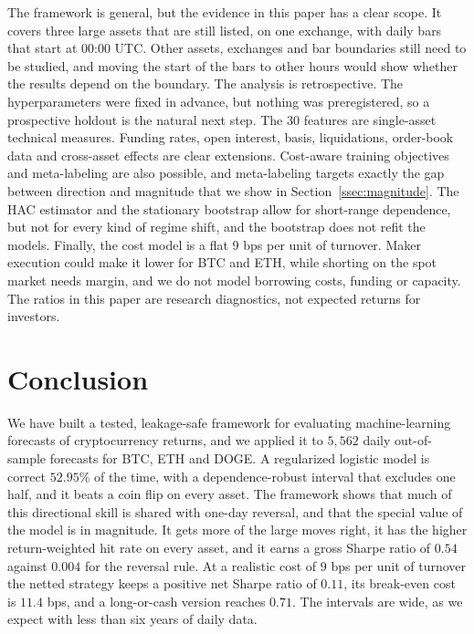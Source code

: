 \documentclass[preprint,12pt,authoryear,a4paper]{elsarticle}
\begin{document}
The framework is general, but the evidence in this paper has a clear scope. It
covers three large assets that are still listed, on one exchange, with daily bars
that start at 00:00 UTC. Other assets, exchanges and bar boundaries still need to
be studied, and moving the start of the bars to other hours would show whether the
results depend on the boundary. The analysis is retrospective. The hyperparameters
were fixed in advance, but nothing was preregistered, so a prospective holdout is
the natural next step. The 30 features are single-asset technical measures.
Funding rates, open interest, basis, liquidations, order-book data and cross-asset
effects are clear extensions. Cost-aware training objectives and meta-labeling
\citep{lopezdeprado2018advances} are also possible, and meta-labeling targets
exactly the gap between direction and magnitude that we show in
Section~\ref{ssec:magnitude}. The HAC estimator and the stationary bootstrap allow
for short-range dependence, but not for every kind of regime shift, and the
bootstrap does not refit the models. Finally, the cost model is a flat 9 bps per
unit of turnover. Maker execution could make it lower for BTC and ETH, while
shorting on the spot market needs margin, and we do not model borrowing costs,
funding or capacity. The ratios in this paper are research diagnostics, not
expected returns for investors.

\section{Conclusion}\label{sec:conclusion}

We have built a tested, leakage-safe framework for evaluating machine-learning
forecasts of cryptocurrency returns, and we applied it to $5{,}562$ daily
out-of-sample forecasts for BTC, ETH and DOGE. A regularized logistic model is
correct $52.95\%$ of the time, with a dependence-robust interval that excludes one
half, and it beats a coin flip on every asset. The framework shows that much of
this directional skill is shared with one-day reversal, and that the special value
of the model is in magnitude. It gets more of the large moves right, it has the
higher return-weighted hit rate on every asset, and it earns a gross Sharpe ratio
of $0.54$ against $0.004$ for the reversal rule. At a realistic cost of 9 bps per
unit of turnover the netted strategy keeps a positive net Sharpe ratio of $0.11$,
its break-even cost is $11.4$ bps, and a long-or-cash version reaches $0.71$. The
intervals are wide, as we expect with less than six years of daily data.
\end{document}
